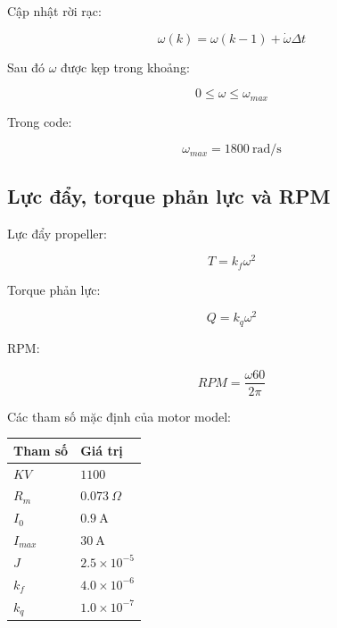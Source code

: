 Cập nhật rời rạc:

\begin{equation}
    \omega(k)
    =
    \omega(k-1)
    +
    \dot{\omega}\Delta t
\end{equation}

Sau đó $\omega$ được kẹp trong khoảng:

\begin{equation}
    0 \leq \omega \leq \omega_{max}
\end{equation}

Trong code:

\begin{equation}
    \omega_{max}=1800\ \mathrm{rad/s}
\end{equation}

\subsection{Lực đẩy, torque phản lực và RPM}

Lực đẩy propeller:

\begin{equation}
    T = k_f\omega^2
\end{equation}

Torque phản lực:

\begin{equation}
    Q = k_q\omega^2
\end{equation}

RPM:

\begin{equation}
    RPM
    =
    \frac{\omega 60}{2\pi}
\end{equation}

Các tham số mặc định của motor model:

\begin{center}
\begin{tabular}{|l|l|}
\hline
Tham số & Giá trị \\
\hline
$KV$ & $1100$ \\
\hline
$R_m$ & $0.073\ \Omega$ \\
\hline
$I_0$ & $0.9\ \mathrm{A}$ \\
\hline
$I_{max}$ & $30\ \mathrm{A}$ \\
\hline
$J$ & $2.5\times10^{-5}$ \\
\hline
$k_f$ & $4.0\times10^{-6}$ \\
\hline
$k_q$ & $1.0\times10^{-7}$ \\
\hline
\end{tabular}
\end{center}

